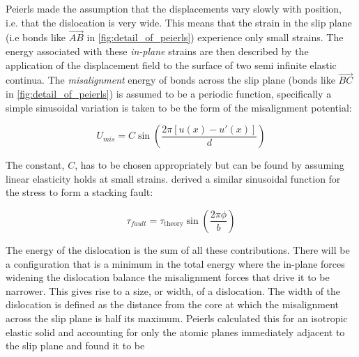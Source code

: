 Peierls made the assumption that the displacements vary slowly with position, i.e. that the dislocation is very wide. This means that the strain in the slip plane (i.e bonds like $\overrightarrow{AB}$ in \autoref{fig:detail_of_peierls}) experience only small strains. The energy associated with these \emph{in-plane} strains are then described  by the application of the displacement field to the surface of two semi infinite elastic continua. 
The \emph{misalignment} energy of bonds across the slip plane (bonds like $\overrightarrow{BC}$ in \autoref{fig:detail_of_peierls}) is assumed to be a periodic function, specifically a simple sinusoidal variation is taken to be the form of the misalignment potential:

\begin{equation}
U_{mis} = C \sin \left(\frac{2\pi [u(x) - u'(x)]}{d} \right)
\end{equation}















%
%
%
%
%
%
%
%
%
%





The constant, $C$, has to be chosen appropriately but can be found by assuming linear elasticity holds at small strains. \citet{Frenkel1926} derived a similar sinusoidal function for the stress to form a stacking fault:










\begin{equation}
\tau_{fault} = \tau_{\text{theory}} \sin \left( \frac{2\pi \phi}{b} \right)
\end{equation}

The energy of the dislocation is the sum of all these contributions. There will be a configuration that is a minimum in the total energy where the in-plane forces widening the dislocation balance the misalignment forces that drive it to be narrower. This gives rise to a size, or width, of a dislocation. The width of the dislocation is defined as the distance from the core at which the misalignment across the slip plane is half its maximum. Peierls calculated this for an isotropic elastic solid and accounting for only the atomic planes immediately adjacent to the slip plane and found it to be 

